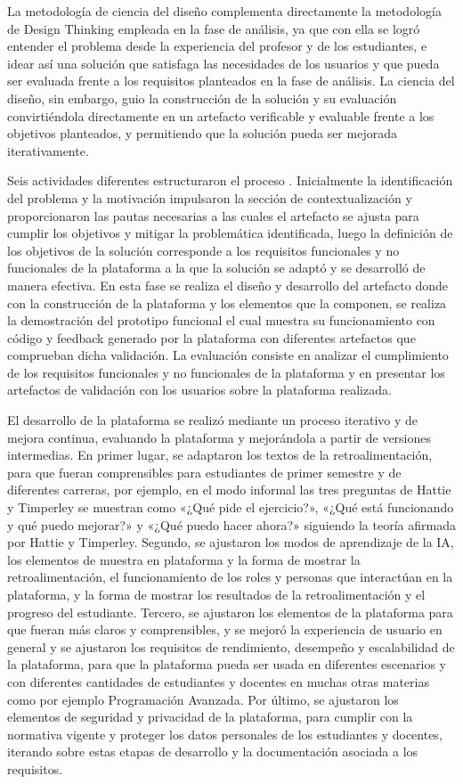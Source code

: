 \documentclass[letterpaper, 10 pt, conference]{ieeeconf}
\begin{document}
La metodología de ciencia del diseño complementa directamente la metodología de Design Thinking empleada en la fase de análisis, ya que con ella se logró entender el problema desde la experiencia del profesor y de los estudiantes, e idear así una solución que satisfaga las necesidades de los usuarios y que pueda ser evaluada frente a los requisitos planteados en la fase de análisis.
La ciencia del diseño, sin embargo, guio la construcción de la solución y su evaluación convirtiéndola directamente en un artefacto verificable y evaluable frente a los objetivos planteados, y permitiendo que la solución pueda ser mejorada iterativamente.

Seis actividades diferentes estructuraron el proceso \cite{26}. Inicialmente la identificación del problema y la motivación impulsaron la sección de contextualización y proporcionaron las pautas necesarias a las cuales 
el artefacto se ajusta para cumplir los objetivos y mitigar la problemática identificada, luego la definición de los objetivos de la solución corresponde a los requisitos funcionales y no funcionales de la plataforma a la que la solución 
se adaptó y se desarrolló de manera efectiva. En esta fase se realiza el diseño y desarrollo del artefacto donde con la construcción de la plataforma y los elementos que la componen, se realiza la demostración del prototipo funcional el cual muestra su funcionamiento
con código y feedback generado por la plataforma con diferentes artefactos que comprueban dicha validación. La evaluación consiste en analizar el cumplimiento de los requisitos funcionales y no funcionales de la plataforma y en presentar los artefactos de validación con los usuarios sobre la plataforma realizada.

El desarrollo de la plataforma se realizó mediante un proceso iterativo y de mejora continua, evaluando la plataforma y mejorándola a partir de versiones intermedias. En primer lugar, se adaptaron los textos de la retroalimentación, para que fueran comprensibles para estudiantes de primer semestre y de diferentes carreras, por ejemplo, en el modo informal las tres preguntas de Hattie y Timperley \cite{1} se muestran como «¿Qué pide el ejercicio?», «¿Qué está funcionando y qué puedo mejorar?» y «¿Qué puedo hacer ahora?» 
siguiendo la teoría afirmada por Hattie y Timperley. Segundo, se ajustaron los modos de aprendizaje de la IA, los elementos de muestra en plataforma y la forma de mostrar la retroalimentación, el funcionamiento de los roles y personas que interactúan en la plataforma, y la forma de mostrar los resultados de la retroalimentación y el progreso del estudiante. Tercero, se ajustaron los elementos de la plataforma para que fueran más claros y comprensibles, y se mejoró la experiencia de usuario en general y 
se ajustaron los requisitos de rendimiento, desempeño y escalabilidad de la plataforma, para que la plataforma pueda ser usada en diferentes escenarios y con diferentes cantidades de estudiantes y docentes en muchas otras materias como por ejemplo Programación Avanzada. Por último, se ajustaron los elementos de seguridad y privacidad de la plataforma, para cumplir con la normativa vigente y proteger los datos personales de los estudiantes y docentes, iterando sobre estas etapas de desarrollo y la documentación asociada a los requisitos.
\end{document}
